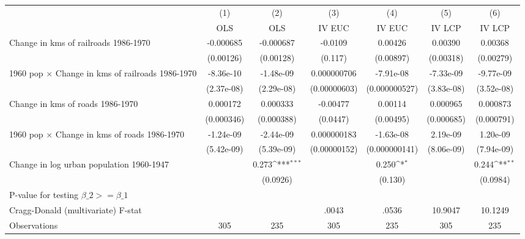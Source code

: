 {
\def\sym#1{\ifmmode^{#1}\else\(^{#1}\)\fi}
\begin{tabular}{l*{6}{c}}
\hline\hline
                &\multicolumn{1}{c}{(1)}&\multicolumn{1}{c}{(2)}&\multicolumn{1}{c}{(3)}&\multicolumn{1}{c}{(4)}&\multicolumn{1}{c}{(5)}&\multicolumn{1}{c}{(6)}\\
                &\multicolumn{1}{c}{OLS}&\multicolumn{1}{c}{OLS}&\multicolumn{1}{c}{IV EUC}&\multicolumn{1}{c}{IV EUC}&\multicolumn{1}{c}{IV LCP}&\multicolumn{1}{c}{IV LCP}\\
\hline
Change in kms of railroads 1986-1970&-0.000685         &-0.000687         &  -0.0109         &  0.00426         &  0.00390         &  0.00368         \\
                &(0.00126)         &(0.00128)         &  (0.117)         &(0.00897)         &(0.00318)         &(0.00279)         \\
[1em]
1960 pop $\times$ Change in kms of railroads 1986-1970&-8.36e-10         &-1.48e-09         &0.000000706         &-7.91e-08         &-7.33e-09         &-9.77e-09         \\
                &(2.37e-08)         &(2.29e-08)         &(0.00000603)         &(0.000000527)         &(3.83e-08)         &(3.52e-08)         \\
[1em]
Change in kms of roads 1986-1970& 0.000172         & 0.000333         & -0.00477         &  0.00114         & 0.000965         & 0.000873         \\
                &(0.000346)         &(0.000388)         & (0.0447)         &(0.00495)         &(0.000685)         &(0.000791)         \\
[1em]
1960 pop $\times$ Change in kms of roads 1986-1970&-1.24e-09         &-2.44e-09         &0.000000183         &-1.63e-08         & 2.19e-09         & 1.20e-09         \\
                &(5.42e-09)         &(5.39e-09)         &(0.00000152)         &(0.000000141)         &(8.06e-09)         &(7.94e-09)         \\
[1em]
Change in log urban population 1960-1947&                  &    0.273\sym{***}&                  &    0.250\sym{*}  &                  &    0.244\sym{**} \\
                &                  & (0.0926)         &                  &  (0.130)         &                  & (0.0984)         \\
\hline
P-value for testing $\beta\_{2} >= \beta\_{1}$&                  &                  &                  &                  &                  &                  \\
Cragg-Donald (multivariate) F-stat&                  &                  &    .0043         &    .0536         &  10.9047         &  10.1249         \\
Observations    &      305         &      235         &      305         &      235         &      305         &      235         \\
\hline\hline
\end{tabular}
}
